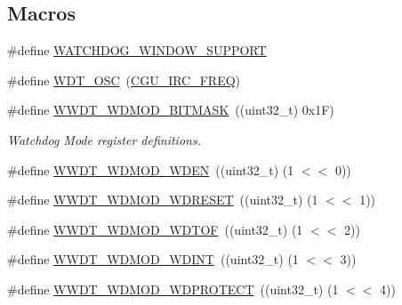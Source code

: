 \subsection*{Macros}
\begin{DoxyCompactItemize}
\item 
\#define \hyperlink{group___w_w_d_t__18_x_x__43_x_x_gafd5360b2cfcfe4271a608b6c90bcea5f}{W\+A\+T\+C\+H\+D\+O\+G\+\_\+\+W\+I\+N\+D\+O\+W\+\_\+\+S\+U\+P\+P\+O\+RT}
\item 
\#define \hyperlink{group___w_w_d_t__18_x_x__43_x_x_ga628282c7bf5c28d5a859e4915c62b643}{W\+D\+T\+\_\+\+O\+SC}~(\hyperlink{group___c_l_o_c_k__18_x_x__43_x_x_gaec3e2b28e900580cc4dc72034f7371fd}{C\+G\+U\+\_\+\+I\+R\+C\+\_\+\+F\+R\+EQ})
\item 
\#define \hyperlink{group___w_w_d_t__18_x_x__43_x_x_gac9ba0cf06012012875985842cabb5a11}{W\+W\+D\+T\+\_\+\+W\+D\+M\+O\+D\+\_\+\+B\+I\+T\+M\+A\+SK}~((uint32\+\_\+t) 0x1\+F)
\begin{DoxyCompactList}\small\item\em Watchdog Mode register definitions. \end{DoxyCompactList}\item 
\#define \hyperlink{group___w_w_d_t__18_x_x__43_x_x_ga9c4d839b554cf8919c76bd613745967f}{W\+W\+D\+T\+\_\+\+W\+D\+M\+O\+D\+\_\+\+W\+D\+EN}~((uint32\+\_\+t) (1 $<$$<$ 0))
\item 
\#define \hyperlink{group___w_w_d_t__18_x_x__43_x_x_gaa6b03ad5df847bc2241c0ea1eefd9431}{W\+W\+D\+T\+\_\+\+W\+D\+M\+O\+D\+\_\+\+W\+D\+R\+E\+S\+ET}~((uint32\+\_\+t) (1 $<$$<$ 1))
\item 
\#define \hyperlink{group___w_w_d_t__18_x_x__43_x_x_ga9379872b1e184e20abf74f1abbdd8cb9}{W\+W\+D\+T\+\_\+\+W\+D\+M\+O\+D\+\_\+\+W\+D\+T\+OF}~((uint32\+\_\+t) (1 $<$$<$ 2))
\item 
\#define \hyperlink{group___w_w_d_t__18_x_x__43_x_x_ga6530623c6535d2c7b65c9b50d320c5f1}{W\+W\+D\+T\+\_\+\+W\+D\+M\+O\+D\+\_\+\+W\+D\+I\+NT}~((uint32\+\_\+t) (1 $<$$<$ 3))
\item 
\#define \hyperlink{group___w_w_d_t__18_x_x__43_x_x_gac44132c9f40915e405e3cfedc2599586}{W\+W\+D\+T\+\_\+\+W\+D\+M\+O\+D\+\_\+\+W\+D\+P\+R\+O\+T\+E\+CT}~((uint32\+\_\+t) (1 $<$$<$ 4))
\end{DoxyCompactItemize}
